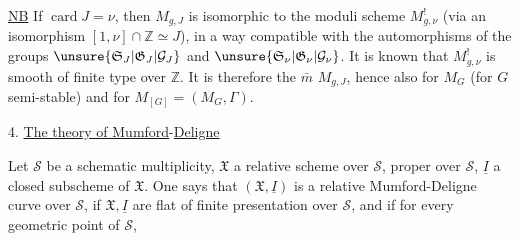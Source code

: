 \uline{NB} If $\operatorname{card}J=\nu$, then $M_{g,J}$ is isomorphic to the moduli scheme $M^!_{g,\nu}$ (via an isomorphism $[1,\nu]\cap\mathbb Z\simeq J$), in a way compatible with the automorphisms of the groups $\unsure{\mathfrak S_J|\mathfrak G_J|\mathcal G_J}$ and $\unsure{\mathfrak S_\nu|\mathfrak G_\nu|\mathcal G_\nu}$. It is known that $M^!_{g,\nu}$ is smooth of finite type over $\mathbb Z$. It is therefore the $\bar m$  $M_{g,J}$, hence also for $M_G$ (for $G$ semi-stable) and for $M_{[G]}=(M_G,\Gamma)$.

4. \uline{The theory of Mumford}-\uline{Deligne}

Let $\mathcal S$ be a schematic multiplicity, $\mathfrak X$ a  relative scheme over $\mathcal S$, proper over $\mathcal S$, $\underline I$ a closed subscheme of $\mathfrak X$. One says that $(\mathfrak X,\underline I)$ is a relative Mumford-Deligne curve over $\mathcal S$, if $\mathfrak X,\underline I$ are flat of finite presentation over $\mathcal S$, and if for every geometric point of $\mathcal S$, 
